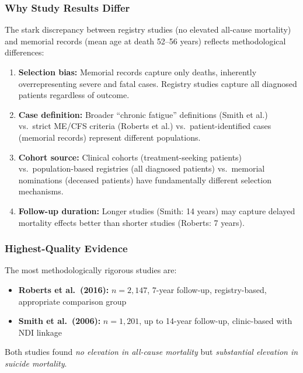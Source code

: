 \subsubsection{Why Study Results Differ}

The stark discrepancy between registry studies (no elevated all-cause mortality) and memorial records (mean age at death 52--56 years) reflects methodological differences:

\begin{enumerate}
    \item \textbf{Selection bias:} Memorial records capture only deaths, inherently overrepresenting severe and fatal cases. Registry studies capture all diagnosed patients regardless of outcome.

    \item \textbf{Case definition:} Broader ``chronic fatigue'' definitions (Smith et al.) vs.\ strict ME/CFS criteria (Roberts et al.) vs.\ patient-identified cases (memorial records) represent different populations.

    \item \textbf{Cohort source:} Clinical cohorts (treatment-seeking patients) vs.\ population-based registries (all diagnosed patients) vs.\ memorial nominations (deceased patients) have fundamentally different selection mechanisms.

    \item \textbf{Follow-up duration:} Longer studies (Smith: 14 years) may capture delayed mortality effects better than shorter studies (Roberts: 7 years).
\end{enumerate}

\subsubsection{Highest-Quality Evidence}

The most methodologically rigorous studies are:
\begin{itemize}
    \item \textbf{Roberts et al.\ (2016):} $n = 2{,}147$, 7-year follow-up, registry-based, appropriate comparison group~\cite{Roberts2016}
    \item \textbf{Smith et al.\ (2006):} $n = 1{,}201$, up to 14-year follow-up, clinic-based with NDI linkage~\cite{Smith2006}
\end{itemize}

Both studies found \textit{no elevation in all-cause mortality} but \textit{substantial elevation in suicide mortality}.

